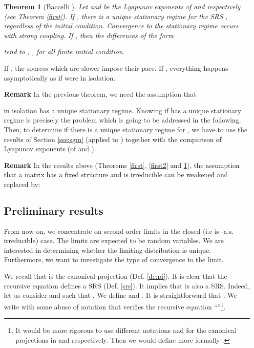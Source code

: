 \documentclass[11pt,titlepage]{article}
\newcommand{\parag}{\medskip\noindent}
\newtheorem{theo}{Theorem }[section]
\begin{document}
\begin{theo}[Baccelli \protect\cite{bacc92}]
Let  and  be the Lyapunov exponents of  and 
respectively (see Theorem \ref{first}). If , 
there is a unique stationary regime 
for the SRS , regardless of the initial condition. Convergence to
the stationary regime occurs with strong coupling.
If , then the differences of the form

tend to , , for all finite initial condition.
\label{bacc}
\end{theo}

If , the sources which
are slower impose their pace. If , 
everything happens asymptotically as if  were in isolation.
 
\parag

{\bf Remark } In the previous theorem, we need the assumption that
 
in isolation has a 
unique stationary regime. Knowing if  has a
unique stationary regime is precisely the problem which is going to be  
addressed in the following.
Then, to determine if there is a unique stationary regime for , we
have to use the results of Section \ref{sse:sgm} (applied to
) together with  
the comparison of Lyapunov exponents (of
 and ).

\parag

{\bf Remark } 
In the results above (Theorems \ref{first}, \ref{first2} and \ref{bacc}), the
assumption that a 
matrix 
 has a fixed structure and is irreducible can be weakened and replaced
by: 




\subsection{Preliminary results}
\label{sse:prr}

From now on, we concentrate on second order limits in the closed (i.e  is
-a.s. irreducible) case. 
The 
limits
are expected to be random variables. We are interested in determining whether
the limiting distribution is unique.
Furthermore, we want to investigate the type 
of convergence to the limit.

\parag

We recall that  is the canonical projection  (Def. \ref{de:pi}). It is clear
that the  
recursive 
equation  defines a SRS (Def. \ref{srs}). It implies that
 is also a SRS. Indeed, let us
consider  and  such that . We define
 and 
. It is straightforward that .
We write with some abuse of 
notation that  verifies
the recursive equation ``''\footnote{It
would be more rigorous to use different notations  and  for
the canonical projections in  and  respectively. Then we would define more formally .}.
\end{document}
